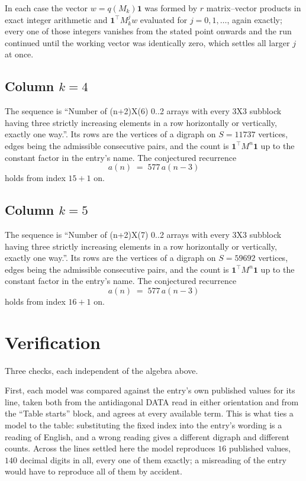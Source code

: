 \documentclass[11pt,a4paper]{article}
\theoremstyle{plain}
\theoremstyle{definition}
\begin{document}
In each case the vector $w=q(M_k)\mathbf{1}$ was formed by $r$ matrix--vector products in
exact integer arithmetic and $\mathbf{1}^{\!\top}M_k^{j}w$ evaluated for $j=0,1,\dots$,
again exactly; every one of those integers vanishes from the stated point onwards and the run
continued until the working vector was identically zero, which settles all larger $j$ at once.

\subsection*{Column $k$$=4$}
The sequence is ``Number of (n+2)X(6) 0..2 arrays with every 3X3 subblock having three strictly increasing elements in a row horizontally or vertically, exactly one way.''. Its rows are the vertices of a digraph on
$S=11737$ vertices, edges being the admissible consecutive pairs, and the count is
$\mathbf{1}^{\!\top}M^{n}\mathbf{1}$ up to the constant factor in the entry's name.
The conjectured recurrence
\[
a(n)\;=\;577\,a(n-3)
\]
holds from index $15+1$ on.

\subsection*{Column $k$$=5$}
The sequence is ``Number of (n+2)X(7) 0..2 arrays with every 3X3 subblock having three strictly increasing elements in a row horizontally or vertically, exactly one way.''. Its rows are the vertices of a digraph on
$S=59692$ vertices, edges being the admissible consecutive pairs, and the count is
$\mathbf{1}^{\!\top}M^{n}\mathbf{1}$ up to the constant factor in the entry's name.
The conjectured recurrence
\[
a(n)\;=\;577\,a(n-3)
\]
holds from index $16+1$ on.

\section{Verification}

Three checks, each independent of the algebra above.

First, each model was compared against the entry's own published values for its line, taken
both from the antidiagonal DATA read in either orientation and from the ``Table starts''
block, and agrees at every available term. This is what ties a model to the table:
substituting the fixed index into the entry's wording is a reading of English, and a wrong
reading gives a different digraph and different counts. Across the lines settled here the
model reproduces $16$ published values, $140$ decimal digits in all, every one of
them exactly; a misreading of the entry would have to reproduce all of them by accident.
\end{document}
